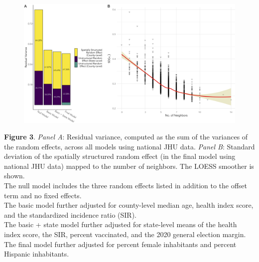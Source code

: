 \documentclass{beamer}
\begin{document}
 \begin{frame}
\vspace*{-0.1cm}
			\begin{figure}
				\centering
				\includegraphics[scale=0.076]{images-logos/combo-res-var-nbs-jhu.png}
				
			\end{figure}      
			\vspace{-0.17cm}
			\tiny{\textbf{Figure 3}. \textit{Panel A}: Residual variance, computed as the sum of the variances of the random effects, across all models using national JHU data.  \textit{Panel B}: Standard deviation of the spatially structured random effect (in the final model using national JHU data) mapped to the number of neighbors. The LOESS smoother is shown.\\
				The null model includes the three random effects listed in addition to the offset term and no fixed effects.\\
				The basic model further adjusted for county-level median age, health index score, and the standardized incidence ratio (SIR).\\
				The basic + state model further adjusted for state-level means of the health index score, the SIR, percent vaccinated, and the 2020 general election margin.\\
				The final model further adjusted for percent female inhabitants and percent Hispanic inhabitants. 
			}



\end{frame}


\end{document}
